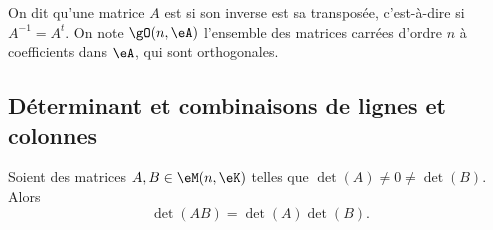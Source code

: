 \begin{definition}\label{DefMatriceOrthogonale}
    On dit qu'une matrice \( A \) est  si son inverse est sa transposée, c'est-à-dire si \( A^{-1} = A^t \). On note \( \gO(n,\eA) \) l'ensemble des matrices carrées d'ordre \( n \) à coefficients dans \( \eA \), qui sont orthogonales.
\end{definition}

\subsection{Déterminant et combinaisons de lignes et colonnes}
\label{SUBSECooKMSVooBBHwkH}

\begin{proposition}     \label{PROPooUCZVooPkloQp}
    Soient des matrices \( A,B\in \eM(n,\eK)\) telles que \( \det(A)\neq 0\neq \det(B)\). Alors
    \begin{equation}
        \det(AB)=\det(A)\det(B).
    \end{equation}
\end{proposition}

